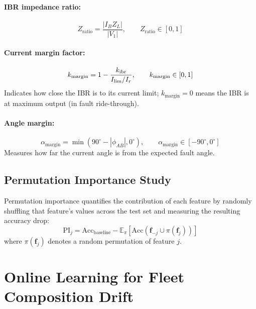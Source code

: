 \paragraph{IBR impedance ratio:}
\begin{equation}
  Z_\mathrm{ratio} = \frac{|I_B Z_L|}{|V_1|}, \qquad Z_\mathrm{ratio} \in [0, 1]
  \label{eq:ch8_zratio}
\end{equation}

\paragraph{Current margin factor:}
\begin{equation}
  k_\mathrm{margin} = 1 - \frac{k_\mathrm{ibr}}{I_\mathrm{lim}/I_r}, \qquad
  k_\mathrm{margin} \in [0, 1]
  \label{eq:ch8_kmargin}
\end{equation}
Indicates how close the IBR is to its current limit; $k_\mathrm{margin} = 0$
means the IBR is at maximum output (in fault ride-through).

\paragraph{Angle margin:}
\begin{equation}
  \alpha_\mathrm{margin} = \min(90^\circ{} - |\phi_{AB}|, 0^\circ{}), \qquad
  \alpha_\mathrm{margin} \in [-90^\circ{}, 0^\circ{}]
  \label{eq:ch8_amargin}
\end{equation}
Measures how far the current angle is from the expected fault angle.

\subsection{Permutation Importance Study}

Permutation importance quantifies the contribution of each feature by
randomly shuffling that feature's values across the test set and measuring
the resulting accuracy drop:
\begin{equation}
  \mathrm{PI}_j = \mathrm{Acc}_\mathrm{baseline}
    - \mathbb{E}_\pi[\mathrm{Acc}(\mathbf{f}_{-j} \cup \pi(\mathbf{f}_j))]
  \label{eq:ch8_pi}
\end{equation}
where $\pi(\mathbf{f}_j)$ denotes a random permutation of feature $j$.


\section{Online Learning for Fleet Composition Drift}
\label{sec:ch8_online}

